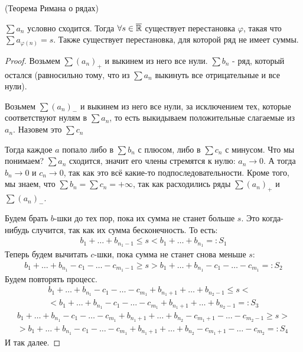 \begin{theorem}
    (Теорема Римана о рядах)

    $\sum a_n$ условно сходится. Тогда $\forall s \in \overline {\mathbb{R}}$ существует перестановка $\varphi$,
     такая что $\sum a_{\varphi(n)} = s$. Также существует перестановка, для которой ряд не имеет суммы.
\end{theorem}
\begin{proof}
    Возьмем $\sum(a_n)_+$ и выкинем из него все нули. $\sum b_n$ - ряд, который остался (равносильно тому, что из $\sum a_n$ выкинуть все отрицательные и все нули).

    Возьмем $\sum(a_n)_-$ и выкинем из него все нули, за исключением тех, которые соответствуют нулям в $\sum a_n$, то есть выкидываем положительные слагаемые из $a_n$. Назовем это $\sum c_n$

    Тогда каждое $a$ попало либо в $\sum b_n$ с плюсом, либо в $\sum c_n$ с минусом.
    Что мы понимаем? $\sum a_n$ сходится, значит его члены стремятся к нулю: $a_n \to 0$. А тогда $b_n \to 0$ и $ c_n \to 0$, так как это всё какие-то подпоследовательности. 
    Кроме того, мы знаем, что $\sum b_n = \sum c_n = +\infty$, так как расходились ряды $\sum(a_n)_+$ и $\sum(a_n)_-$.

    Будем брать $b$-шки до тех пор, пока их сумма не станет больше $s$. Это когда-нибудь случится, так как их сумма бесконечность. То есть:
    \begin{gather*}
        b_1 + \ldots + b_{n_1 - 1} \leqslant s < b_1 + \ldots + b_{n_1} =: S_1
    \end{gather*}
    Теперь будем вычитать $c$-шки, пока сумма не станет снова меньше $s$:
    \begin{gather*}
        b_1 + \ldots + b_{n_1} - c_1 - \ldots - c_{m_1 - 1} \geqslant s > b_1 + \ldots + b_{n_1} - c_1 - \ldots - c_{m_1} =: S_2
    \end{gather*}
    Будем повторять процесс.
    \begin{gather*}
        b_1 + \ldots + b_{n_1} - c_1 - \ldots -  c_{m_1} + b_{n_1 + 1} + \ldots + b_{n_2-1} \leqslant s < \\
        < b_1 + \ldots + b_{n_1} - c_1 - \ldots -  c_{m_1} + b_{n_1 + 1} + \ldots + b_{n_2-1} =: S_3
    \end{gather*}
    \begin{gather*}
        b_1 + \ldots + b_{n_1} - c_1 - \ldots -  c_{m_1} + b_{n_1 + 1} + \ldots + b_{n_2} - c_{m_1+1} - \ldots - c_{m_2-1} \geqslant s > \\
         > b_1 + \ldots + b_{n_1} - c_1 - \ldots -  c_{m_1} + b_{n_1 + 1} + \ldots + b_{n_2} - c_{m_1+1} - \ldots - c_{m_2} =: S_4
    \end{gather*}
    И так далее.


\end{proof}
